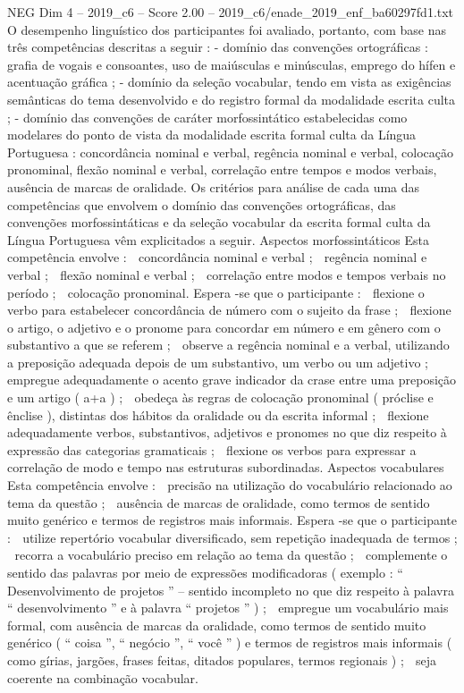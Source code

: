\begin{textsample}{NEG Dim 4 – 2019\_c6 – Score 2.00 – 2019\_c6/enade\_2019\_enf\_ba60297fd1.txt}
O desempenho linguístico dos participantes foi avaliado, portanto, com base nas três competências descritas a seguir : - domínio das convenções ortográficas : grafia de vogais e consoantes, uso de maiúsculas e minúsculas, emprego do hífen e acentuação gráfica ; - domínio da seleção vocabular, tendo em vista as exigências semânticas do tema desenvolvido e do registro formal da modalidade escrita culta ; - domínio das convenções de caráter morfossintático estabelecidas como modelares do ponto de vista da modalidade escrita formal culta da Língua Portuguesa : concordância nominal e verbal, regência nominal e verbal, colocação pronominal, flexão nominal e verbal, correlação entre tempos e modos verbais, ausência de marcas de oralidade.
Os critérios para análise de cada uma das competências que envolvem o domínio das convenções ortográficas, das convenções morfossintáticas e da seleção vocabular da escrita formal culta da Língua Portuguesa vêm explicitados a seguir.
Aspectos morfossintáticos Esta competência envolve :  concordância nominal e verbal ;  regência nominal e verbal ;  flexão nominal e verbal ;  correlação entre modos e tempos verbais no período ;  colocação pronominal.
Espera -se que o participante :  flexione o verbo para estabelecer concordância de número com o sujeito da frase ;  flexione o artigo, o adjetivo e o pronome para concordar em número e em gênero com o substantivo a que se referem ;  observe a regência nominal e a verbal, utilizando a preposição adequada depois de um substantivo, um verbo ou um adjetivo ;  empregue adequadamente o acento grave indicador da crase entre uma preposição e um artigo ( a+a ) ;  obedeça às regras de colocação pronominal ( próclise e ênclise ), distintas dos hábitos da oralidade ou da escrita informal ;  flexione adequadamente verbos, substantivos, adjetivos e pronomes no que diz respeito à expressão das categorias gramaticais ;  flexione os verbos para expressar a correlação de modo e tempo nas estruturas subordinadas.
Aspectos vocabulares Esta competência envolve :  precisão na utilização do vocabulário relacionado ao tema da questão ;  ausência de marcas de oralidade, como termos de sentido muito genérico e termos de registros mais informais.
Espera -se que o participante :  utilize repertório vocabular diversificado, sem repetição inadequada de termos ;  recorra a vocabulário preciso em relação ao tema da questão ;  complemente o sentido das palavras por meio de expressões modificadoras ( exemplo : “ Desenvolvimento de projetos ” – sentido incompleto no que diz respeito à palavra “ desenvolvimento ” e à palavra “ projetos ” ) ;  empregue um vocabulário mais formal, com ausência de marcas da oralidade, como termos de sentido muito genérico ( “ coisa ”, “ negócio ”, “ você ” ) e termos de registros mais informais ( como gírias, jargões, frases feitas, ditados populares, termos regionais ) ;  seja coerente na combinação vocabular.

\end{textsample}
